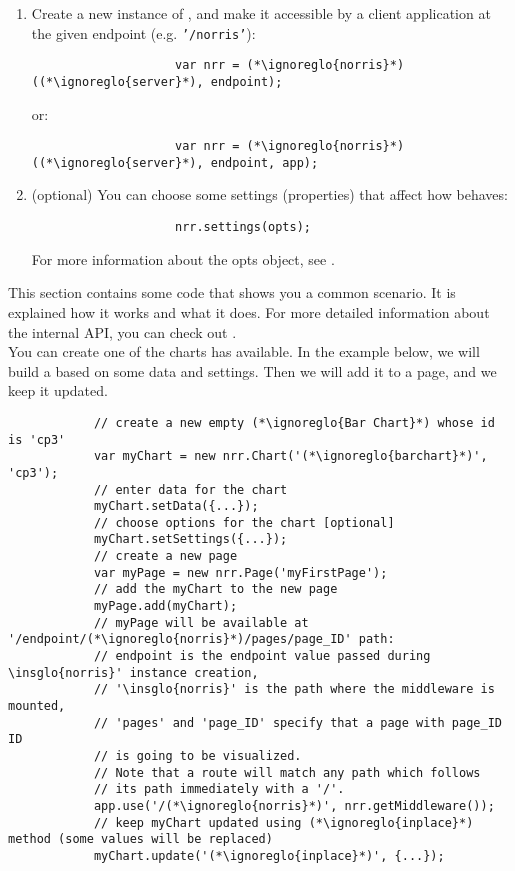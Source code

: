 \begin{itemize}
\begin{enumerate}
\begin{lstlisting}
					var (*\ignoreglo{norris}*) = require('(*\ignoreglo{norris}*)');
				\end{lstlisting}
				\item Create a new instance of , and make it accessible by a client application at the given endpoint (e.g. \texttt{'/norris'}):
				\begin{lstlisting}
					var nrr = (*\ignoreglo{norris}*)((*\ignoreglo{server}*), endpoint);
				\end{lstlisting}
				or:
				\begin{lstlisting}
					var nrr = (*\ignoreglo{norris}*)((*\ignoreglo{server}*), endpoint, app);
				\end{lstlisting}
				\item (optional) You can choose some settings (properties) that affect how  behaves:
				\begin{lstlisting}
					nrr.settings(opts);
				\end{lstlisting}
				For more information about the opts object, see .
			\end{enumerate}
		\end{itemize}
		This section contains some code that shows you a common scenario. It is explained how it works and what it does. For more detailed information about the internal API, you can check out .\\
		You can create one of the charts  has available. In the example below, we will build a  based on some data and settings. Then we will add it to a page, and we keep it updated.
		\begin{lstlisting}
			// create a new empty (*\ignoreglo{Bar Chart}*) whose id is 'cp3'
			var myChart = new nrr.Chart('(*\ignoreglo{barchart}*)', 'cp3');
			// enter data for the chart
			myChart.setData({...});
			// choose options for the chart [optional]
			myChart.setSettings({...});
			// create a new page
			var myPage = new nrr.Page('myFirstPage');
			// add the myChart to the new page
			myPage.add(myChart);
			// myPage will be available at '/endpoint/(*\ignoreglo{norris}*)/pages/page_ID' path:
			// endpoint is the endpoint value passed during \insglo{norris}' instance creation,
			// '\insglo{norris}' is the path where the middleware is mounted, 
			// 'pages' and 'page_ID' specify that a page with page_ID ID 
			// is going to be visualized. 
			// Note that a route will match any path which follows 
			// its path immediately with a '/'.
			app.use('/(*\ignoreglo{norris}*)', nrr.getMiddleware());
			// keep myChart updated using (*\ignoreglo{inplace}*) method (some values will be replaced)
			myChart.update('(*\ignoreglo{inplace}*)', {...});
		\end{lstlisting}
